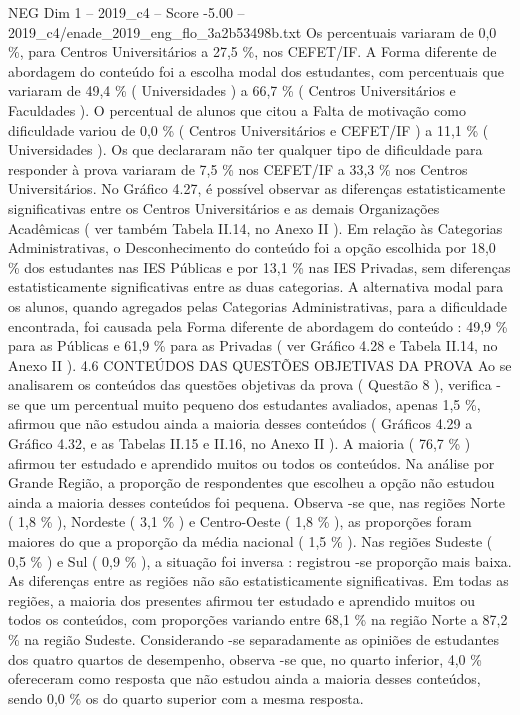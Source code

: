 \begin{textsample}{NEG Dim 1 – 2019\_c4 – Score -5.00 – 2019\_c4/enade\_2019\_eng\_flo\_3a2b53498b.txt}
Os percentuais variaram de 0,0 \%, para Centros Universitários a 27,5 \%, nos CEFET/IF.
A Forma diferente de abordagem do conteúdo foi a escolha modal dos estudantes, com percentuais que variaram de 49,4 \% ( Universidades ) a 66,7 \% ( Centros Universitários e Faculdades ).
O percentual de alunos que citou a Falta de motivação como dificuldade variou de 0,0 \% ( Centros Universitários e CEFET/IF ) a 11,1 \% ( Universidades ).
Os que declararam não ter qualquer tipo de dificuldade para responder à prova variaram de 7,5 \% nos CEFET/IF a 33,3 \% nos Centros Universitários.
No Gráfico 4.27, é possível observar as diferenças estatisticamente significativas entre os Centros Universitários e as demais Organizações Acadêmicas ( ver também Tabela II.14, no Anexo II ).
Em relação às Categorias Administrativas, o Desconhecimento do conteúdo foi a opção escolhida por 18,0 \% dos estudantes nas IES Públicas e por 13,1 \% nas IES Privadas, sem diferenças estatisticamente significativas entre as duas categorias.
A alternativa modal para os alunos, quando agregados pelas Categorias Administrativas, para a dificuldade encontrada, foi causada pela Forma diferente de abordagem do conteúdo : 49,9 \% para as Públicas e 61,9 \% para as Privadas ( ver Gráfico 4.28 e Tabela II.14, no Anexo II ). 4.6 CONTEÚDOS DAS QUESTÕES OBJETIVAS DA PROVA Ao se analisarem os conteúdos das questões objetivas da prova ( Questão 8 ), verifica -se que um percentual muito pequeno dos estudantes avaliados, apenas 1,5 \%, afirmou que não estudou ainda a maioria desses conteúdos ( Gráficos 4.29 a Gráfico 4.32, e as Tabelas II.15 e II.16, no Anexo II ).
A maioria ( 76,7 \% ) afirmou ter estudado e aprendido muitos ou todos os conteúdos.
Na análise por Grande Região, a proporção de respondentes que escolheu a opção não estudou ainda a maioria desses conteúdos foi pequena.
Observa -se que, nas regiões Norte ( 1,8 \% ), Nordeste ( 3,1 \% ) e Centro-Oeste ( 1,8 \% ), as proporções foram maiores do que a proporção da média nacional ( 1,5 \% ).
Nas regiões Sudeste ( 0,5 \% ) e Sul ( 0,9 \% ), a situação foi inversa : registrou -se proporção mais baixa.
As diferenças entre as regiões não são estatisticamente significativas.
Em todas as regiões, a maioria dos presentes afirmou ter estudado e aprendido muitos ou todos os conteúdos, com proporções variando entre 68,1 \% na região Norte a 87,2 \% na região Sudeste.
Considerando -se separadamente as opiniões de estudantes dos quatro quartos de desempenho, observa -se que, no quarto inferior, 4,0 \% ofereceram como resposta que não estudou ainda a maioria desses conteúdos, sendo 0,0 \% os do quarto superior com a mesma resposta.

\end{textsample}
